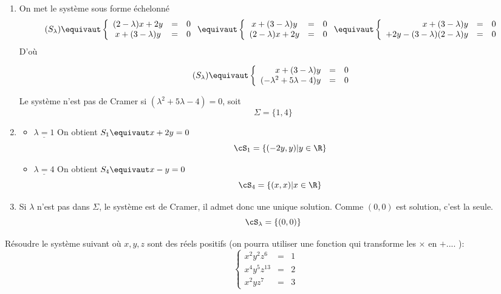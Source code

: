\documentclass[a4paper, 11pt,reqno]{article}
\begin{document}
\begin{correction}
\begin{enumerate}
\item  On met le système sous forme échelonné
$$(S_\lambda)\equivaut  \left\{ \begin{array}{ccc}
(2-\lambda)x +2y & =& 0\\
x +(3-\lambda)y  & =& 0
\end{array}\right.
\equivaut 
\left\{ \begin{array}{ccc}
x +(3-\lambda)y  & =& 0\\
(2-\lambda)x +2y & =& 0
\end{array}\right.
\equivaut 
\left\{ \begin{array}{rcc}
x +(3-\lambda)y  & =& 0\\
+2y -  (3-\lambda) (2-\lambda) y& =& 0
\end{array}\right.
 $$
 D'où 
 
 $$(S_\lambda)\equivaut  \left\{ \begin{array}{rcc}
x +(3-\lambda)y  & =& 0\\
  (-\lambda^2 +5\lambda -4) y& =& 0
\end{array}\right.$$
 
Le système n'est pas de Cramer si  $ (\lambda^2 +5\lambda -4) =0$, soit 
$$\Sigma =\{ 1, 4\}$$
\item \begin{itemize}
\item $\underline{\lambda=1}$
On obtient $S_1 \equivaut x+ 2y =0$
$$\cS_1 =\{ (-2y, y) | y \in \R\}$$

\item $\underline{\lambda=4}$
On obtient $S_4 \equivaut x-y =0$
$$\cS_4 =\{ (x, x) | x \in \R\}$$
\end{itemize}

\item Si $\lambda$ n'est pas dans $ \Sigma$, le système est de Cramer, il admet donc une unique solution. Comme $(0,0)$ est solution, c'est la seule. 
$$\cS_\lambda =\{ (0,0)\}$$
\end{enumerate}
\end{correction}




\begin{exercice}
Résoudre le système suivant où $x,y,z$ sont des réels positifs (on pourra utiliser une fonction qui transforme les $\times$ en $+$.... ): 
$$\left\{ \begin{array}{ccc}
x^2y^2z^6 & =& 1\\
x^4y^5z^{13}& =& 2 \\
x^2yz^7 & =& 3
\end{array}\right. $$
\end{exercice}
\end{document}
